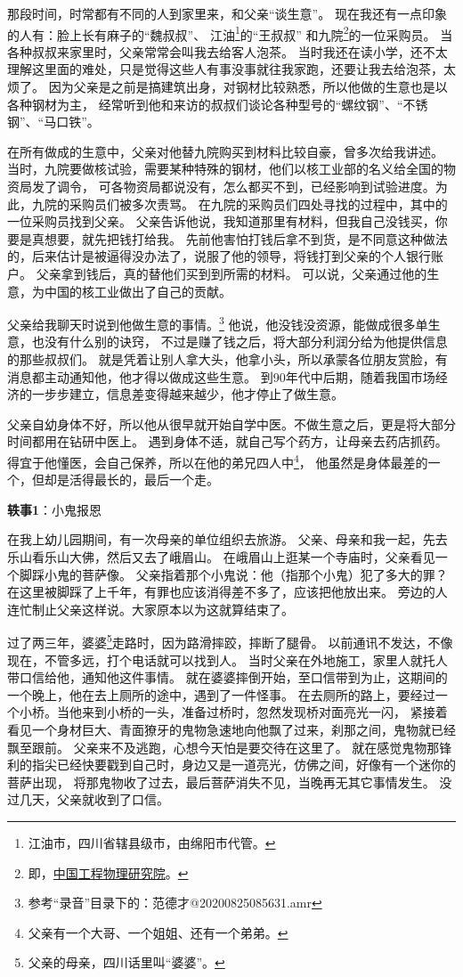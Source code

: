 那段时间，时常都有不同的人到家里来，和父亲“谈生意”。
现在我还有一点印象的人有：脸上长有麻子的“魏叔叔”、
江油\footnote{江油市，四川省辖县级市，由绵阳市代管。}的“王叔叔”
和九院\footnote{即，\href{https://baike.baidu.com/item/中国工程物理研究院}{中国工程物理研究院}。}的一位采购员。
当各种叔叔来家里时，父亲常常会叫我去给客人泡茶。
当时我还在读小学，还不太理解这里面的难处，只是觉得这些人有事没事就往我家跑，还要让我去给泡茶，太烦了。
因为父亲是之前是搞建筑出身，对钢材比较熟悉，所以他做的生意也是以各种钢材为主，
经常听到他和来访的叔叔们谈论各种型号的“螺纹钢”、“不锈钢”、“马口铁”。

在所有做成的生意中，父亲对他替九院购买到材料比较自豪，曾多次给我讲述。
当时，九院要做核试验，需要某种特殊的钢材，他们以核工业部的名义给全国的物资局发了调令，
可各物资局都说没有，怎么都买不到，已经影响到试验进度。为此，九院的采购员们被多次责骂。
在九院的采购员们四处寻找的过程中，其中的一位采购员找到父亲。
父亲告诉他说，我知道那里有材料，但我自己没钱买，你要是真想要，就先把钱打给我。
先前他害怕打钱后拿不到货，是不同意这种做法的，后来估计是被逼得没办法了，说服了他的领导，将钱打到父亲的个人银行账户。
父亲拿到钱后，真的替他们买到到所需的材料。
可以说，父亲通过他的生意，为中国的核工业做出了自己的贡献。

父亲给我聊天时说到他做生意的事情。\footnote{参考“录音”目录下的：范德才@20200825085631.amr}
他说，他没钱没资源，能做成很多单生意，也没有什么别的诀窍，
不过是赚了钱之后，将大部分利润分给为他提供信息的那些叔叔们。
就是凭着让别人拿大头，他拿小头，所以承蒙各位朋友赏脸，有消息都主动通知他，他才得以做成这些生意。
到90年代中后期，随着我国市场经济的一步步建立，信息差变得越来越少，他才停止了做生意。

父亲自幼身体不好，所以他从很早就开始自学中医。不做生意之后，更是将大部分时间都用在钻研中医上。
遇到身体不适，就自己写个药方，让母亲去药店抓药。
得宜于他懂医，会自己保养，所以在他的弟兄四人中\footnote{父亲有一个大哥、一个姐姐、还有一个弟弟。}，
他虽然是身体最差的一个，但却是活得最长的，最后一个走。

\contentsep

\textbf{轶事1}：小鬼报恩

在我上幼儿园期间，有一次母亲的单位组织去旅游。
父亲、母亲和我一起，先去乐山看乐山大佛，然后又去了峨眉山。
在峨眉山上逛某一个寺庙时，父亲看见一个脚踩小鬼的菩萨像。
父亲指着那个小鬼说：他（指那个小鬼）犯了多大的罪？在这里被脚踩了上千年，有罪也应该消得差不多了，应该把他放出来。
旁边的人连忙制止父亲这样说。大家原本以为这就算结束了。

过了两三年，婆婆\footnote{父亲的母亲，四川话里叫“婆婆”。}走路时，因为路滑摔跤，摔断了腿骨。
以前通讯不发达，不像现在，不管多远，打个电话就可以找到人。
当时父亲在外地施工，家里人就托人带口信给他，通知他这件事情。
就在婆婆摔倒开始，至口信带到为止，这期间的一个晚上，他在去上厕所的途中，遇到了一件怪事。
在去厕所的路上，要经过一个小桥。当他来到小桥的一头，准备过桥时，忽然发现桥对面亮光一闪，
紧接着看见一个身材巨大、青面獠牙的鬼物急速地向他飘了过来，刹那之间，鬼物就已经飘至跟前。
父亲来不及逃跑，心想今天怕是要交待在这里了。
就在感觉鬼物那锋利的指尖已经快要戳到自己时，身边又是一道亮光，仿佛之间，好像有一个迷你的菩萨出现，
将那鬼物收了过去，最后菩萨消失不见，当晚再无其它事情发生。
没过几天，父亲就收到了口信。

